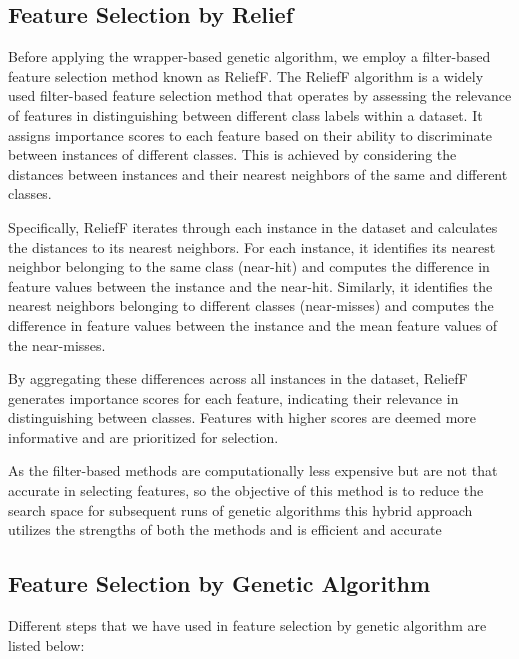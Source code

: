 \subsection{Feature Selection by Relief}

Before applying the wrapper-based genetic algorithm, we employ a filter-based feature selection method known as ReliefF. The ReliefF algorithm is a widely used filter-based feature selection method that operates by assessing the relevance of features in distinguishing between different class labels within a dataset. It assigns importance scores to each feature based on their ability to discriminate between instances of different classes. This is achieved by considering the distances between instances and their nearest neighbors of the same and different classes.

Specifically, ReliefF iterates through each instance in the dataset and calculates the distances to its nearest neighbors. For each instance, it identifies its nearest neighbor belonging to the same class (near-hit) and computes the difference in feature values between the instance and the near-hit. Similarly, it identifies the nearest neighbors belonging to different classes (near-misses) and computes the difference in feature values between the instance and the mean feature values of the near-misses.

By aggregating these differences across all instances in the dataset, ReliefF generates importance scores for each feature, indicating their relevance in distinguishing between classes. Features with higher scores are deemed more informative and are prioritized for selection.

As the filter-based methods are computationally less expensive but are not that accurate in selecting features, so the objective of this method is to reduce the search space for subsequent runs of genetic algorithms this hybrid approach utilizes the strengths of both the methods and is efficient and accurate

\subsection{Feature Selection by Genetic Algorithm}

Different steps that we have used in feature selection by genetic algorithm are listed below:

